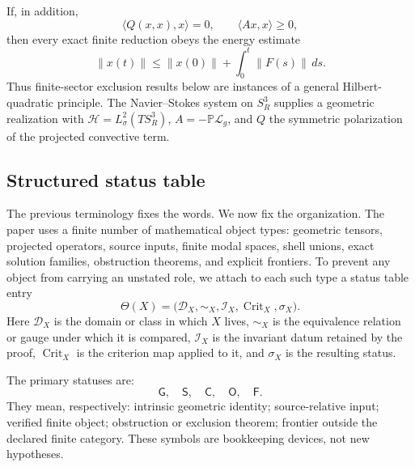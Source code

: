 \documentclass[aps,prd,reprint,superscriptaddress,nofootinbib,floatfix]{revtex4-2}
\theoremstyle{definition}
\theoremstyle{remark}
\newcommand{\PP}{\mathbb{P}}
\begin{document}
If, in addition,
\[
	\langle Q(x,x),x\rangle=0,\qquad \langle Ax,x\rangle\ge0 ,
	\label{eq:abstractenergy}
\]
then every exact finite reduction obeys the energy estimate
\[
	\|x(t)\|\le \|x(0)\|+\int_0^t\|F(s)\|\,ds.
\]
Thus finite-sector exclusion results below are instances of a general Hilbert-quadratic principle.  The Navier--Stokes system on \(S^3_R\) supplies a geometric realization with \(\mathcal H=L^2_\sigma(TS^3_R)\), \(A=-\PP\mathcal L_g\), and \(Q\) the symmetric polarization of the projected convective term.

\subsection{Structured status table}\label{subsec:statusnormalform}

The previous terminology fixes the words.  We now fix the organization.  The paper uses a finite number of mathematical object types: geometric tensors, projected operators, source inputs, finite modal spaces, shell unions, exact solution families, obstruction theorems, and explicit frontiers.  To prevent any object from carrying an unstated role, we attach to each such type a status table entry
\[
	\Theta(X)=\bigl(\mathscr D_X,\sim_X,\mathscr I_X,\operatorname{Crit}_X,\sigma_X\bigr).
\]
Here \(\mathscr D_X\) is the domain or class in which \(X\) lives, \(\sim_X\) is the equivalence relation or gauge under which it is compared, \(\mathscr I_X\) is the invariant datum retained by the proof, \(\operatorname{Crit}_X\) is the criterion map applied to it, and \(\sigma_X\) is the resulting status.

The primary statuses are:
\[
	\mathsf G,\quad \mathsf S,\quad \mathsf C,\quad \mathsf O,\quad \mathsf F.
\]
They mean, respectively: intrinsic geometric identity; source-relative input; verified finite object; obstruction or exclusion theorem; frontier outside the declared finite category.  These symbols are bookkeeping devices, not new hypotheses.
\end{document}
